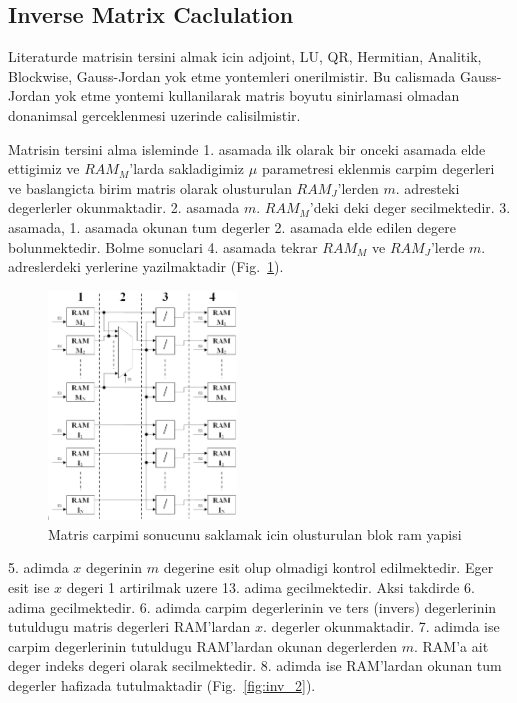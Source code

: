 \documentclass[]{interact}
\theoremstyle{plain}%
\theoremstyle{definition}
\theoremstyle{remark}
\begin{document}
\subsection{Inverse Matrix Caclulation}
Literaturde matrisin tersini almak icin adjoint,  LU, QR, Hermitian, Analitik, Blockwise, Gauss-Jordan yok etme yontemleri onerilmistir. Bu calismada Gauss-Jordan yok etme yontemi kullanilarak matris boyutu sinirlamasi olmadan donanimsal gerceklenmesi uzerinde calisilmistir.

Matrisin tersini alma isleminde 1. asamada ilk olarak bir onceki asamada elde ettigimiz ve $RAM_{M}$’larda sakladigimiz $\mu$ parametresi eklenmis carpim degerleri ve baslangicta birim matris olarak olusturulan $RAM_J$’lerden $m.$  adresteki degerlerler okunmaktadir. 2. asamada $m.$ $RAM_M$’deki deki deger secilmektedir. 3. asamada, 1. asamada okunan tum degerler 2. asamada elde edilen degere bolunmektedir. Bolme sonuclari 4. asamada tekrar $RAM_M$ ve $RAM_J$’lerde $m.$  adreslerdeki yerlerine yazilmaktadir (Fig.~\ref{fig:inv_1}).


\begin{figure}[h]
  \centering
  \includegraphics[width=5cm]{inv_1}

  \caption{Matris carpimi sonucunu saklamak icin olusturulan blok ram yapisi}
  \label{fig:inv_1}
\end{figure}

5. adimda $x$  degerinin $m$  degerine esit olup olmadigi kontrol edilmektedir. Eger esit ise $x$  degeri 1 artirilmak uzere 13. adima gecilmektedir. Aksi takdirde 6. adima gecilmektedir. 6. adimda carpim degerlerinin ve ters (invers) degerlerinin tutuldugu matris degerleri RAM’lardan $x.$  degerler okunmaktadir. 7. adimda ise carpim degerlerinin tutuldugu RAM’lardan okunan degerlerden $m.$  RAM’a ait deger indeks degeri olarak secilmektedir. 8. adimda ise RAM’lardan okunan tum degerler hafizada tutulmaktadir (Fig.~\ref{fig:inv_2}).
\end{document}
